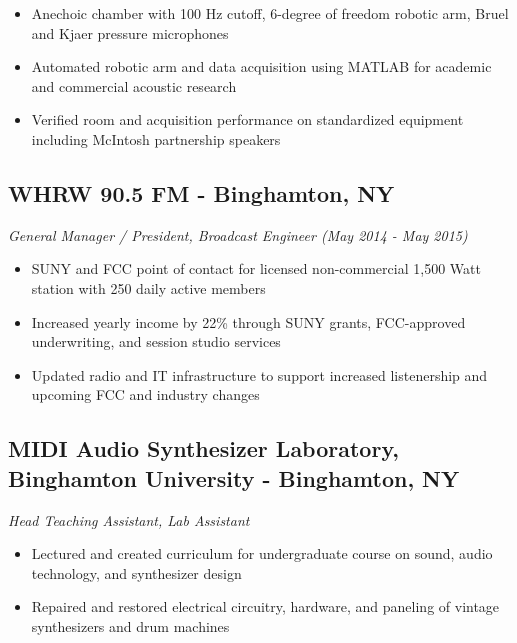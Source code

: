 \documentclass[10pt,letterpaper]{article}
\begin{document}
\begin{itemize}
\item
  Anechoic chamber with 100 Hz cutoff, 6-degree of freedom robotic arm,
  Bruel and Kjaer pressure microphones
\item
  Automated robotic arm and data acquisition using MATLAB for academic
  and commercial acoustic research
\item
  Verified room and acquisition performance on standardized equipment
  including McIntosh partnership speakers
\end{itemize}

\hypertarget{whrw-90.5-fm---binghamton-ny}{%
\subsection{WHRW 90.5 FM - Binghamton,
NY}\label{whrw-90.5-fm---binghamton-ny}}

\emph{General Manager / President, Broadcast Engineer (May 2014 - May
2015)}

\begin{itemize}
\item
  SUNY and FCC point of contact for licensed non-commercial 1,500 Watt
  station with 250 daily active members
\item
  Increased yearly income by 22\% through SUNY grants, FCC-approved
  underwriting, and session studio services
\item
  Updated radio and IT infrastructure to support increased listenership
  and upcoming FCC and industry changes
\end{itemize}

\hypertarget{midi-audio-synthesizer-laboratory-binghamton-university---binghamton-ny}{%
\subsection{MIDI Audio Synthesizer Laboratory, Binghamton University -
Binghamton,
NY}\label{midi-audio-synthesizer-laboratory-binghamton-university---binghamton-ny}}

\emph{Head Teaching Assistant, Lab Assistant}

\begin{itemize}
\item
  Lectured and created curriculum for undergraduate course on sound,
  audio technology, and synthesizer design
\item
  Repaired and restored electrical circuitry, hardware, and paneling of
  vintage synthesizers and drum machines
\end{itemize}
\end{document}
